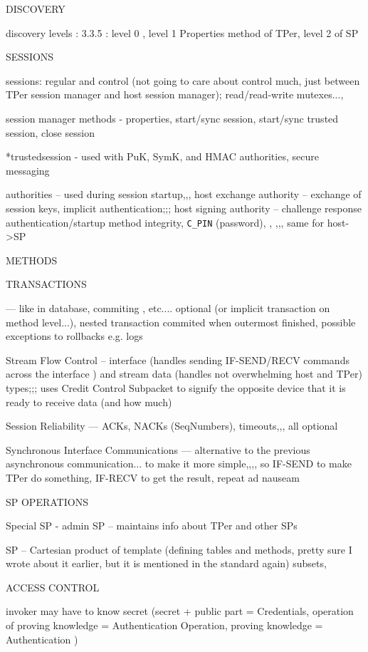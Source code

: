 \documentclass[
  digital, %
  oneside, %
  nolof,     %
  nolot,     %
]{fithesis4}
\begin{document}
DISCOVERY

discovery levels : 3.3.5 : level 0 , level 1 Properties method of TPer, level 2 of SP

SESSIONS

sessions: regular and control (not going to care about control much, just between TPer session manager and host session manager); read/read-write mutexes..., 

session manager methods - properties, start/sync session, start/sync trusted session, close session

*trustedsession - used with PuK, SymK, and HMAC authorities, secure messaging

authorities -- used during session startup,,, host exchange authority -- exchange of session keys, implicit authentication;;; host signing authority -- challenge response authentication/startup method integrity, \verb|C_PIN| (password), , ,,, same for host->SP

METHODS

TRANSACTIONS 

--- like in database, commiting , etc.... optional (or implicit transaction on method level...), nested transaction commited when outermost finished, possible exceptions to rollbacks e.g. logs

Stream Flow Control -- interface (handles  sending IF-SEND/RECV commands across the interface ) and stream data (handles not overwhelming host and TPer) types;;; uses Credit Control Subpacket to signify the opposite device that it is ready to receive data (and how much)

Session Reliability --- ACKs, NACKs (SeqNumbers), timeouts,,, all optional

Synchronous Interface Communications --- alternative to the previous asynchronous communication... to make it more simple,,,, so IF-SEND to make TPer do something, IF-RECV to get the result, repeat ad nauseam


SP OPERATIONS

Special SP - admin SP -- maintains info about TPer and other SPs

SP -- Cartesian product of template (defining tables and methods, pretty sure I wrote about it earlier, but it is mentioned in the standard again) subsets, 

ACCESS CONTROL

invoker may have to know secret (secret + public part = Credentials, operation of proving knowledge = Authentication Operation, proving knowledge = Authentication )
\end{document}
